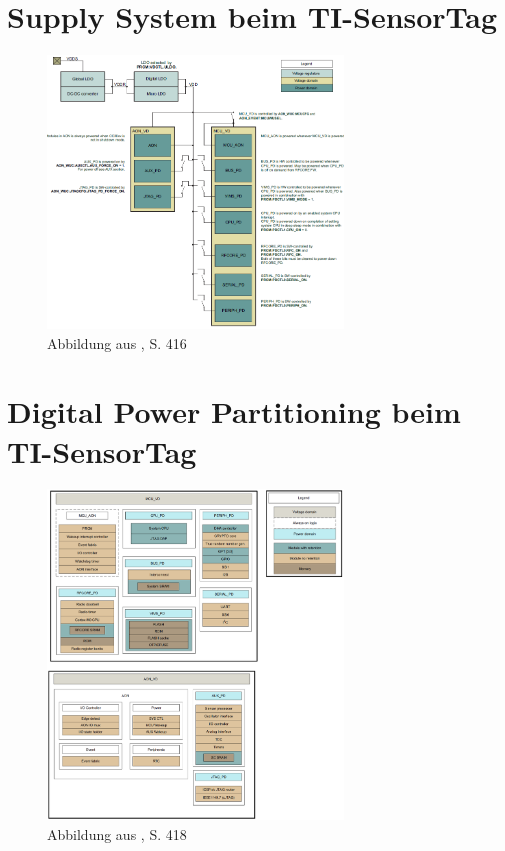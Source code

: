 \chapter{Supply System beim TI-SensorTag}
\label{anhang_sensortag_supply} 


\begin{figure}[h]
    \includegraphics [width=0.7\textwidth]{7Anhang/imag/powerdomain_1.png} 
    \caption{Abbildung aus \cite{Sensortag_Manual}, S. 416}
    \label{a_supply}
\end{figure}

\chapter{Digital Power Partitioning beim TI-SensorTag}\label{anhang_sensortag_PowerDomain} 


\begin{figure}[h]
    \includegraphics [width=0.7\textwidth]{7Anhang/imag/powerDomain_2.png} 
     \caption{Abbildung aus \cite{Sensortag_Manual}, S. 418}
     \label{a_powerdomain}
\end{figure}

